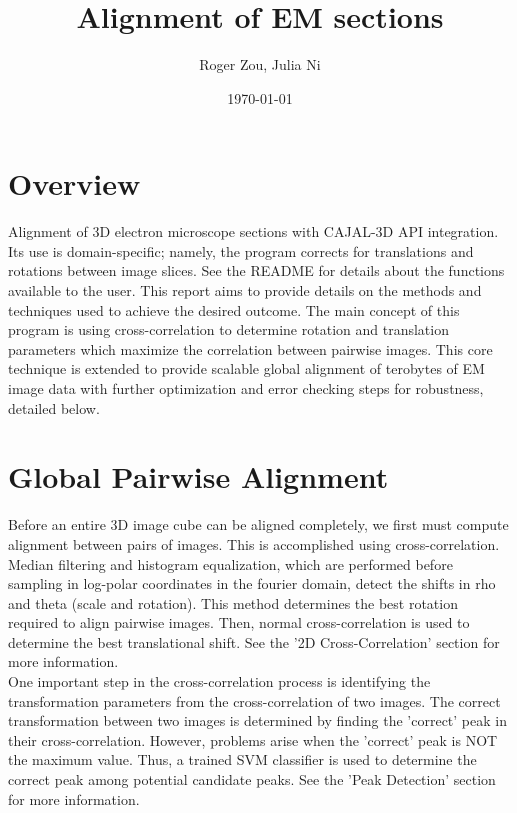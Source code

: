 \documentclass{article}
\author{Roger Zou, Julia Ni}
\date{\today}
\title{Alignment of EM sections}
\begin{document}
  
\maketitle

\section{Overview}
Alignment of 3D electron microscope sections with CAJAL-3D API integration. Its use is domain-specific; namely, the program corrects for translations and rotations between image slices.  See the README for details about the functions available to the user. This report aims to provide details on the methods and techniques used to achieve the desired outcome. The main concept of this program is using cross-correlation to determine rotation and translation parameters which maximize the correlation between pairwise images. This core technique is extended to provide scalable global alignment of terobytes of EM image data with further optimization and error checking steps for robustness, detailed below.

\section{Global Pairwise Alignment}
Before an entire 3D image cube can be aligned completely, we first must compute alignment between pairs of images. This is accomplished using cross-correlation.\\
Median filtering and histogram equalization, which are performed before sampling in log-polar coordinates in the fourier domain, detect the shifts in rho and theta (scale and rotation). This method determines the best rotation required to align pairwise images. Then, normal cross-correlation is used to determine the best translational shift. See the '2D Cross-Correlation' section for more information.\\
One important step in the cross-correlation process is identifying the transformation parameters from the cross-correlation of two images. The correct transformation between two images is determined by finding the 'correct' peak in their cross-correlation. However, problems arise when the 'correct' peak is NOT the maximum value. Thus, a trained SVM classifier is used to determine the correct peak among potential candidate peaks. See the 'Peak Detection' section for more information. \\
\end{document}
